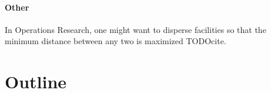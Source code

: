 
\paragraph{Other}

In Operations Research, one might want to disperse facilities so that the minimum distance between any two is maximized TODOcite.

\section{Outline}
